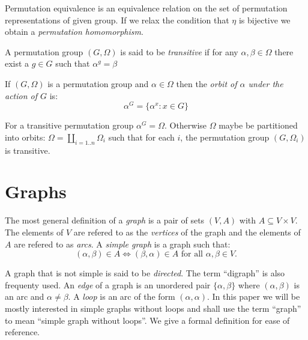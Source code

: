 Permutation equivalence is an equivalence relation
on the set of permutation representations of given group.
If we relax the condition that $\eta$ is bijective 
we obtain a {\it permutation homomorphism}.

\begin{definition}
A permutation group  $(G, \Omega)$ is said to be \emph{transitive}
if for any $\alpha, \beta \in \Omega$ there exist a $ g \in G $
such that $\alpha^g = \beta$
\end{definition}

\begin{definition}[Orbit]
If $(G, \Omega)$ is a permutation group and $\alpha \in \Omega$ 
then the \emph{orbit of $\alpha$ under the action of $G$} is:
$$ \alpha^G = \{ \alpha^x : x \in G \} $$
\end{definition}

For a transitive permutation group $\alpha^G = \Omega$.
Otherwise $\Omega$ maybe be partitioned into orbits:
$ \Omega = \coprod_{i = 1..n} \Omega_i $
such that for each $i$, the permutation group $(G,{\Omega_i})$ is transitive.


\section{Graphs}

The most general definition of a {\it graph} is a pair of sets $(V, A)$
with $A \subseteq V \times V$.
The elements of $V$ are refered to as the {\it vertices} of the graph
and the elements of $A$ are refered to as {\it arcs}.
A {\it simple graph} is a graph such that:
$$ (\alpha,\beta) \in A \Longleftrightarrow (\beta, \alpha) \in A
\mbox{ for all } \alpha, \beta \in V.$$ 

A graph that is not simple is said to be {\it directed}.
The term ``digraph'' is also frequenty used.
An {\it edge} of a graph is an unordered pair $\{\alpha,\beta\}$
where $(\alpha,\beta)$ is an arc and $\alpha \neq \beta$.
A {\it loop} is an arc of the form $(\alpha,\alpha)$.
In this paper we will be mostly interested
in simple graphs without loops
and shall use the term ``graph'' to mean
``simple graph without loops''. We give a formal definition for ease of reference.

